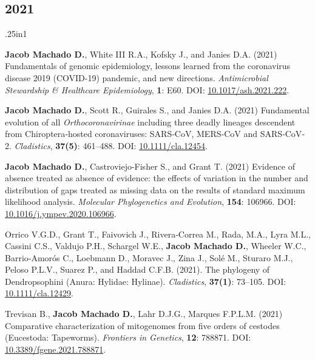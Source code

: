 \documentclass[11pt, letterpaper, sans]{moderncv}
\begin{document}

\subsection{2021}

    {\setlength{\parskip}{.5em}\renewcommand{\baselinestretch}{2.0}\begin{hangparas}{.25in}{1}

		\textbf{Jacob Machado D.}, White III R.A., Kofsky J., and Janies D.A. (2021) Fundamentals of genomic epidemiology, lessons learned from the coronavirus disease 2019 (COVID-19) pandemic, and new directions. \textit{Antimicrobial Stewardship \& Healthcare Epidemiology}, \textbf{1}: E60. DOI: \href{https://doi.org/10.1017/ash.2021.222}{10.1017/ash.2021.222}.

		\textbf{Jacob Machado D.}, Scott R., Guirales S., and Janies D.A. (2021) Fundamental evolution of all \emph{Orthocoronavirinae} including three deadly lineages descendent from Chiroptera‐hosted coronaviruses: SARS‐CoV, MERS‐CoV and SARS‐CoV‐2. \emph{Cladistics}, \textbf{37(5)}: 461--488. DOI: \href{https://doi.org/10.1111/cla.12454}{10.1111/cla.12454}.

		\textbf{Jacob Machado D.}, Castroviejo-Fisher S., and Grant T. (2021) Evidence of absence treated as absence of evidence: the effects of variation in the number and distribution of gaps treated as missing data on the results of standard maximum likelihood analysis. \emph{Molecular Phylogenetics and Evolution}, \textbf{154}: 106966. DOI: \href{https://doi.org/10.1016/j.ympev.2020.106966}{10.1016/j.ympev.2020.106966}.

        Orrico V.G.D., Grant T., Faivovich J., Rivera‐Correa M., Rada, M.A., Lyra M.L., Cassini C.S., Valdujo P.H., Schargel W.E., \textbf{Jacob Machado D.}, Wheeler W.C., Barrio‐Amorós C., Loebmann D., Moravec J., Zina J., Solé M., Sturaro M.J., Peloso P.L.V., Suarez P., and Haddad C.F.B. (2021). The phylogeny of Dendropsophini (Anura: Hylidae: Hylinae). \emph{Cladistics}, \textbf{37(1)}: 73--105. DOI: \href{https://doi.org/10.1111/cla.12429}{10.1111/cla.12429}.

        Trevisan B., \textbf{Jacob Machado D.}, Lahr D.J.G., Marques F.P.L.M. (2021) Comparative characterization of mitogenomes from five orders of cestodes (Eucestoda: Tapeworms). \textit{Frontiers in Genetics}, \textbf{12}: 788871. DOI: \href{https://doi.org/10.3389/fgene.2021.788871}{10.3389/fgene.2021.788871}.

	\end{hangparas}}
\end{document}
